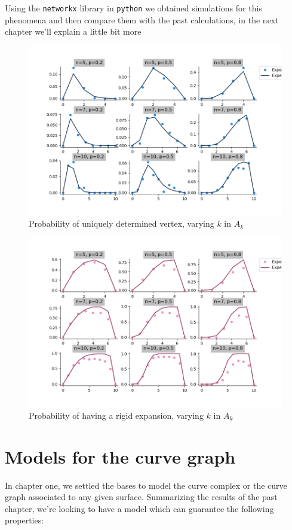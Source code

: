 Using the \texttt{networkx} library in \texttt{python} we obtained simulations for this phenomena and then compare them with the past calculations, in the next chapter we'll explain a little bit more

\begin{figure}[h!]
	\centering
	\includegraphics[scale=0.5]{Python/Figures/Uniquely-determinated-fixed-vertex.png}
	\caption{Probability of uniquely determined vertex, varying $k$ in $A_k$}
\end{figure}

\begin{figure}[h!]
	\centering
	\includegraphics[scale=0.5]{Python/Figures/Expansion-probability.png}
	\caption{Probability of having a rigid expansion,  varying $k$ in $A_k$}
\end{figure}

\section{Models for the curve graph}
In chapter one, we settled the bases to model the curve complex or the curve graph associated to any given surface. Summarizing the results of the past chapter, we're looking to have a model which can guarantee the following properties:

